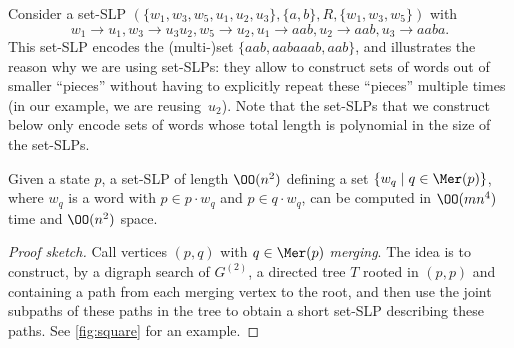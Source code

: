 \begin{exa}\label{ex:set-slp}
    Consider a set-SLP $(\{w_1, w_3, w_5, u_1, u_2, u_3\}, \{a, b\}, R, \{w_1, w_3, w_5\})$ with 
\[w_1 \to u_1, w_3 \to u_3 u_2, w_5 \to u_2, 
u_1 \to aab, u_2 \to aab, u_3 \to aaba.\]
This set-SLP encodes the (multi-)set $\{aab, aabaaab, aab\}$, and illustrates the reason why we are using set-SLPs: they allow to construct sets of words out of smaller ``pieces'' without having to explicitly repeat these ``pieces'' multiple times (in our example, we are reusing~$u_2$). Note that the set-SLPs that we construct below only encode sets of words whose total length is polynomial in the size of the set-SLPs.
\end{exa}


\begin{lem}
\label{lemma:fast-pair}
    Given a state $p$, a set-SLP of length $\OO(n^2)$ defining a set $\{w_q \mid q \in \Mer(p)\}$, where $w_q$ is a word with $p \in p \cdot w_q$ and $p \in q \cdot w_q$, can be computed in $\OO(mn^4)$ time and $\OO(n^2)$ space.
\end{lem}
\begin{proof}[Proof sketch]
Call vertices $(p, q)$ with $q \in \Mer(p)$ \emph{merging}. The idea is to construct, by a digraph search of $G^{(2)}$, a directed tree $T$ rooted in $(p, p)$  and containing a path from each merging vertex to the root, and then use the joint subpaths of these paths in the tree to obtain a short set-SLP describing these paths. See \autoref{fig:square} for an example.
\end{proof}
